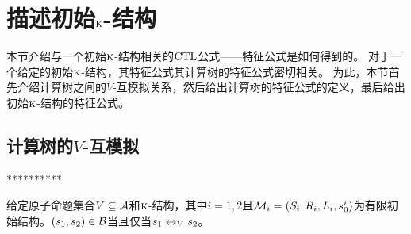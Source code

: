 \section{描述初始$\textsc{k}$-结构}\label{sec:chapter06_chaIntC}
本节介绍与一个初始$\textsc{k}$-结构相关的$\textrm{CTL}$公式——特征公式是如何得到的。
对于一个给定的初始$\textsc{k}$-结构，其特征公式其计算树的特征公式密切相关。
为此，本节首先介绍计算树之间的$V$-互模拟关系，然后给出计算树的特征公式的定义，最后给出初始$\textsc{k}$-结构的特征公式。

\subsection{计算树的$V$-互模拟}
**********
\begin{lemma}
给定原子命题集合$V\subseteq {\cal A}$和$\textsc{k}$-结构，其中$i=1,2$且${\cal M}_i=(S_i, R_i, L_i, s_0^i)$为有限初始结构。$(s_1, s_2)\in {\cal B}$当且仅当$s_1 \leftrightarrow_V s_2$。
\end{lemma}
